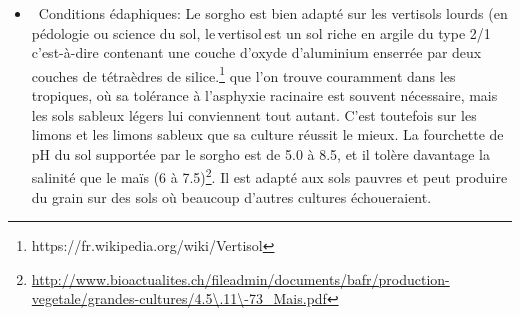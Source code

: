 \documentclass[a4paper,11pt]{article}
\begin{document}
\begin{itemize}
 
 \item~Conditions édaphiques:
  Le sorgho est bien adapté sur les vertisols lourds (en pédologie ou science du sol,
 le\,vertisol\,est un sol riche en argile du type 2/1 c’est-à-dire
 contenant une couche d’oxyde d’aluminium enserrée par deux couches de
 tétraèdres de
 silice.\footnote{https://fr.wikipedia.org/wiki/Vertisol} que l’on
 trouve couramment dans les tropiques, où sa tolérance à l’asphyxie
 racinaire est souvent nécessaire, mais les sols sableux légers lui
 conviennent tout autant. C’est toutefois sur les limons et les limons
 sableux que sa culture réussit le mieux. La fourchette de pH du sol
 supportée par le sorgho est de 5.0 à 8.5, et il tolère davantage la
 salinité que le maïs (6 à
 7.5)\footnote{\url{http://www.bioactualites.ch/fileadmin/documents/bafr/production-vegetale/grandes-cultures/4.5\.11\-73_Mais.pdf}}. Il
 est adapté aux sols pauvres et peut produire du grain sur des sols où
 beaucoup d’autres cultures échoueraient.
 
 \end{itemize}
 
\end{document}
